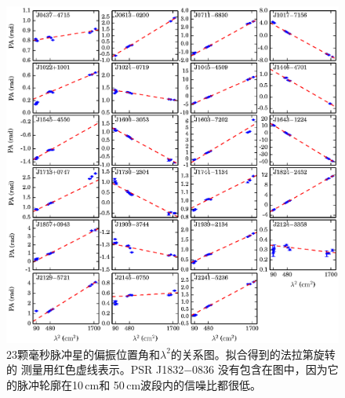 \begin{figure}
\begin{center}
\includegraphics[width=6 in]{rm.ps}
\caption{23颗毫秒脉冲星的偏振位置角和$\lambda^2$的关系图。拟合得到的法拉第旋转的
测量用红色虚线表示。PSR J1832$-$0836 没有包含在图中，因为它的脉冲轮廓在10\,cm和
50\,cm波段内的信噪比都很低。} 
\label{rmFreq}
\end{center}
\end{figure}


